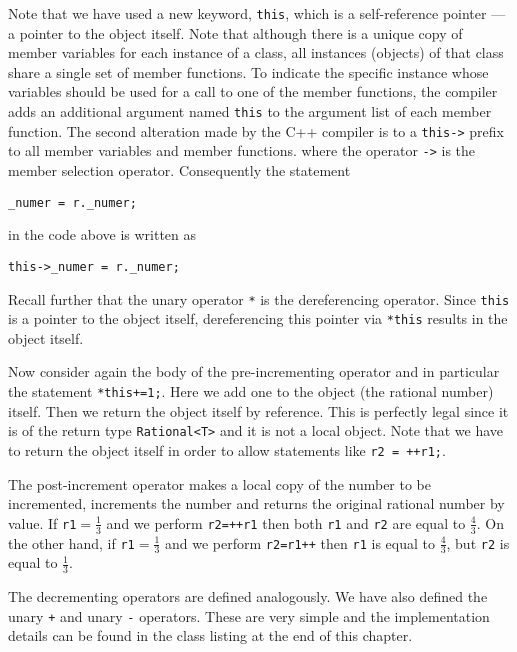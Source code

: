 Note that we have used a new keyword,
\verb+this+, which is a self-reference pointer --- a pointer to the 
object itself. Note that although there is a unique copy of member
variables for each instance of a class, all instances (objects) of
that class share a single set of member functions. To indicate
the specific instance whose variables should be used for a call
to one of the member functions, the compiler adds an additional
argument named \verb+this+ to the argument list of each member 
function. The second alteration made by the C++ compiler is
to a \verb+this->+ prefix to all member variables and member
functions. where the operator \verb+->+ is the member selection
operator. Consequently the statement
{\footnotesize \begin{verbatim}
_numer = r._numer;
\end{verbatim}}
in the code above is written as
{\footnotesize \begin{verbatim}
this->_numer = r._numer;
\end{verbatim}}
Recall further that the unary operator \verb+*+ is the dereferencing
operator. Since \verb+this+ is a pointer to the object itself, 
dereferencing this pointer via \verb+*this+ results in the object itself.

Now consider again the body of the pre-incrementing operator and in
particular the statement \verb&*this+=1;&. Here we add one to the
object (the rational number) itself. Then we return the object itself
by reference. This is perfectly legal since it is of the return type
\verb+Rational<T>+ and it is not a local object. Note that we have
to return the object itself in order to allow statements like
\verb&r2 = ++r1;&.

The post-increment operator makes a local copy
of the number to be incremented, increments the number and returns the
original rational number by value. If \verb+r1+$=\!\!\frac{1}{3}$ and we perform
\verb&r2=++r1& then both \verb+r1+ and \verb+r2+ are equal to $\frac{4}{3}$.
On the other hand, if \verb+r1+$=\!\!\frac{1}{3}$ and we perform
\verb&r2=r1++& then \verb+r1+ is equal to $\frac{4}{3}$, but \verb+r2+ is
equal to $\frac{1}{3}$.

The decrementing operators are defined analogously. We have also
defined the  unary \verb&+& and unary \verb+-+ operators. These are very
simple and the implementation details can be found in the class listing at
the end of this chapter.


